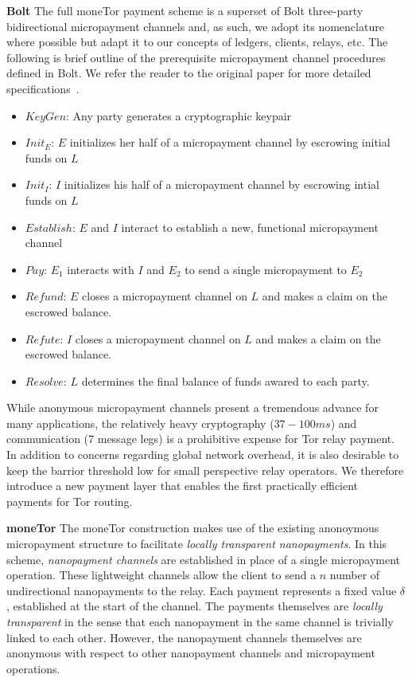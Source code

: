 \textbf{Bolt} The full moneTor payment scheme is a superset of Bolt three-party bidirectional
micropayment channels and, as such, we adopt its nomenclature where possible but
adapt it to our concepts of ledgers, clients, relays, etc. The following is brief
outline of the prerequisite micropayment channel procedures defined in Bolt. We
refer the reader to the original paper for more detailed
specifications~\cite{green2017bolt}.

\begin{itemize}
\item $KeyGen$: Any party generates a cryptographic keypair
\item $Init_E$: $E$ initializes her half of a micropayment channel by escrowing
  initial funds on $L$
\item $Init_I$: $I$ initializes his half of a micropayment channel by
  escrowing intial funds on $L$
\item $Establish$: $E$ and $I$ interact to establish a new, functional
  micropayment channel
\item $Pay$: $E_1$ interacts with $I$ and $E_2$ to send a single micropayment to $E_2$
\item $Refund$: $E$ closes a micropayment channel on $L$ and makes a claim on
  the escrowed balance.
\item $Refute$: $I$ closes a micropayment channel on $L$ and makes a claim on
  the escrowed balance.
\item $Resolve$: $L$ determines the final balance of funds awared to
  each party.
\end{itemize}

While anonymous micropayment channels present a tremendous advance for many
applications, the relatively heavy cryptography ($37-100 ms$) and communication
(7 message legs) is a prohibitive expense for Tor relay payment. In addition to
concerns regarding global network overhead, it is also desirable to keep the
barrior threshold low for small perspective relay operators. We therefore
introduce a new payment layer that enables the first practically efficient
payments for Tor routing.

\textbf{moneTor} The moneTor construction makes use of the existing anonoymous
micropayment structure to facilitate \emph{locally transparent nanopayments}. In
this scheme, \emph{nanopayment channels} are established in place of a single
micropayment operation. These lightweight channels allow the client to send a
$n$ number of undirectional nanopayments to the relay. Each payment represents a
fixed value $\delta$, established at the start of the channel. The payments
themselves are \emph{locally transparent} in the sense that each nanopayment in
the same channel is trivially linked to each other. However, the nanopayment
channels themselves are anonymous with respect to other nanopayment channels and
micropayment operations.

